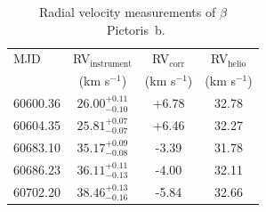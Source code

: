 \documentclass[fleqn,usenatbib]{mnras}
\newcommand{\kms}{km s$^{-1}$}
\newcommand{\bpb}{$\beta$~Pictoris~b}
\begin{document}
%
%
\begin{table}
\centering                        %
   \bgroup
   \caption{Radial velocity measurements of \bpb{}.}    \egroup             %

    \def\arraystretch{1.35}
\begin{tabular}{l c c c}      %
\hline\hline               %
MJD & RV$_{\textrm{instrument}}$ & RV$_{\textrm{corr}}$ & RV$_{\textrm{helio}}$ \\         %
 & (\kms{}) & (\kms{}) & (\kms{}) \\
\hline                      %
60600.36 & $26.00_{-0.10}^{+0.11}$ & +6.78 & 32.78 \\ 
60604.35 & $25.81_{-0.07}^{+0.07}$ & +6.46 & 32.27 \\ 
60683.10 & $35.17_{-0.08}^{+0.09}$ & -3.39 & 31.78 \\
60686.23 & $36.11_{-0.13}^{+0.11}$ & -4.00 & 32.11 \\
60702.20 & $38.46_{-0.16}^{+0.13}$ & -5.84 & 32.66 \\

\end{tabular}
\end{table}
\end{document}
